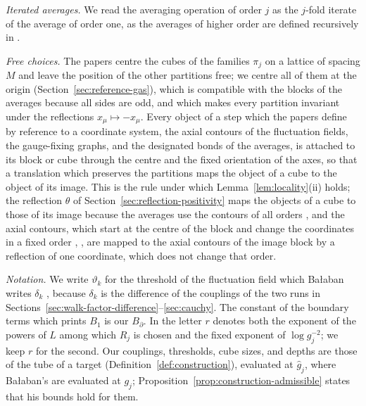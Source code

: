 \documentclass[11pt]{preprint}
\numberwithin{equation}{section}
\theoremstyle{definition}
\theoremstyle{remark}
\theoremstyle{plain}
\begin{document}
\emph{Iterated averages.} We read the averaging operation of order $j$ as the $j$-fold iterate of the average of order one, as the averages of higher order are defined recursively in \cite[(43), p.~24]{BalabanAVG}.

\emph{Free choices.} The papers centre the cubes of the families $\pi_j$ on a lattice of spacing $M$ \cite[p.~257]{BalabanRG1} and leave the position of the other partitions free; we centre all of them at the origin (Section~\ref{sec:reference-gas}), which is compatible with the blocks of the averages \cite[(0.3), p.~252]{BalabanRG1} because all sides are odd, and which makes every partition invariant under the reflections $x_\mu \mapsto -x_\mu$. Every object of a step which the papers define by reference to a coordinate system, the axial contours of the fluctuation fields, the gauge-fixing graphs, and the designated bonds of the averages, is attached to its block or cube through the centre and the fixed orientation of the axes, so that a translation which preserves the partitions maps the object of a cube to the object of its image. This is the rule under which Lemma~\ref{lem:locality}(ii) holds; the reflection $\theta$ of Section~\ref{sec:reflection-positivity} maps the objects of a cube to those of its image because the averages use the contours of all orders \cite[p.~252]{BalabanRG1}, and the axial contours, which start at the centre of the block and change the coordinates in a fixed order \cite[(1.7), p.~18]{BalabanPRT1}, \cite[p.~275]{BalabanRG1}, are mapped to the axial contours of the image block by a reflection of one coordinate, which does not change that order.

\emph{Notation.} We write $\vartheta_k$ for the threshold of the fluctuation field which Ba{\l}aban writes $\delta_k$ \cite[(3.19), p.~268]{BalabanCRE}, because $\delta_k$ is the difference of the couplings of the two runs in Sections~\ref{sec:walk-factor-difference}--\ref{sec:cauchy}. The constant of the boundary terms which \cite[(2.47), p.~264]{BalabanCRE} prints $B_1$ is our $B_\partial$. In \cite[(2.5), p.~255]{BalabanCRE} the letter $r$ denotes both the exponent of the powers of $L$ among which $R_j$ is chosen and the fixed exponent of $\log g_j^{-2}$; we keep $r$ for the second. Our couplings, thresholds, cube sizes, and depths are those of the tube of a target (Definition~\ref{def:construction}), evaluated at $\hat g_j$, where Ba{\l}aban's are evaluated at $g_j$; Proposition~\ref{prop:construction-admissible} states that his bounds hold for them.
\end{document}
